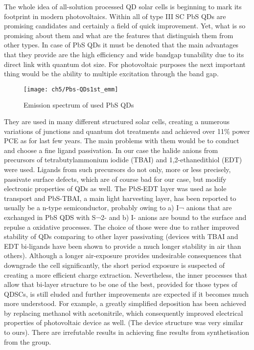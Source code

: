 

The whole idea of all-solution processed QD solar cells is beginning to mark its footprint in modern photovoltaics. Within all of type III SC PbS QDs are promising candidates and certainly a field of quick improvement. Yet, what is so promising about them and what are the features that distinguish them from other types. 
In case of PbS QDs it must be denoted that the main advantages that they provide are the high efficiency and wide bandgap tunability due to its direct link with quantum dot size. For photovoltaic purposes the next important thing would be the ability to multiple excitation through the band gap. 

\begin{wrapfigure}{l}{0.551\textwidth}
\center
\texttt{[image: ch5/Pbs-QDs1st\_emm]}
\caption{Emission spectrum of used PbS QDs \cite{2011}}
\end{wrapfigure}
They are used in many different structured solar cells, creating a numerous variations of junctions and quantum dot treatments and achieved over 11\% power PCE as for last few years. The main problems with them would be to conduct and choose a fine ligand passivation. In our case the halide anions from precursors of tetrabutylammonium iodide (TBAI) and 1,2-ethanedithiol (EDT) were used. Ligands from such precursors do not only, more or less precisely, passivate surface defects, which are of course bad for our case, but modify electronic properties of QDs as well. The PbS-EDT layer was used as hole transport and  PbS-TBAI, a main light harvesting layer,  has been reported to usually be a n-type semiconductor, probably owing to a) I¬  anions that are exchanged in PbS QDS with S¬2- and b) I- anions are bound to the surface and repulse a oxidative processes. The choice of those were due to rather improved stability of QDs comparing to other layer passivating (devices with TBAI and EDT bi-ligands have been shown to provide a much longer stability in air than others). Although a longer air-exposure provides undesirable consequences that downgrade the cell significantly, the short period exposure is suspected of creating a more efficient charge extraction. Nevertheless, the inner processes that allow that bi-layer structure to be one of the best, provided for those types of QDSCs, is still eluded and further improvements are expected if it becomes much more understood. For example, a greatly simplified deposition has been achieved by replacing methanol with acetonitrile, which consequently improved electrical properties of photovoltaic device as well. (The device structure was very similar to ours). There are irrefutable results in achieving fine results from synthetisation from the group.\cite{Wang2017} \cite{Hu2016}

